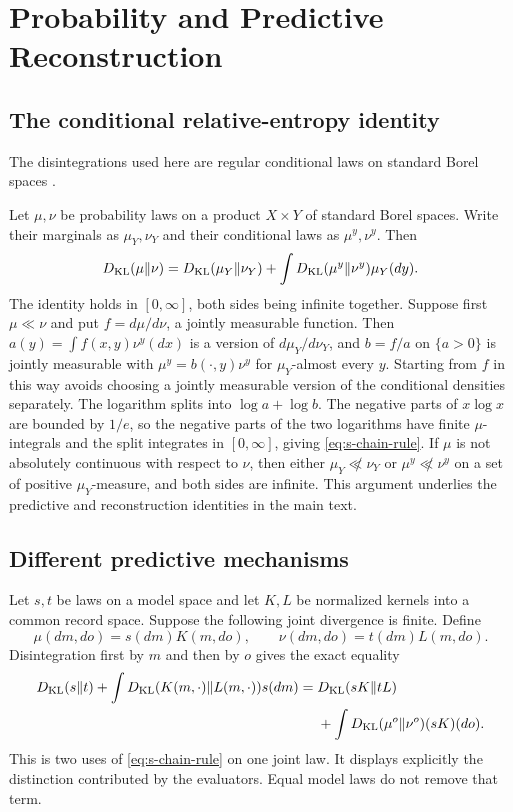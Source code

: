 \chapter{Probability and Predictive Reconstruction}
\label{s:probability}

\section{The conditional relative-entropy identity}

The disintegrations used here are regular conditional laws on standard Borel spaces \citep{Kallenberg2021}.

Let $\mu,\nu$ be probability laws on a product $X\times Y$ of standard Borel spaces. Write their marginals as $\mu_Y,\nu_Y$ and their conditional laws as $\mu^y,\nu^y$. Then
\begin{equation}
D_{\mathrm{KL}}(\mu\Vert\nu)
=D_{\mathrm{KL}}(\mu_Y\Vert\nu_Y)
+\int D_{\mathrm{KL}}(\mu^y\Vert\nu^y)\mu_Y(dy).
\label{eq:s-chain-rule}
\end{equation}
The identity holds in $[0,\infty]$, both sides being infinite together. Suppose first $\mu\ll\nu$ and put $f=d\mu/d\nu$, a jointly measurable function. Then $a(y)=\int f(x,y)\nu^y(dx)$ is a version of $d\mu_Y/d\nu_Y$, and $b=f/a$ on $\{a>0\}$ is jointly measurable with $\mu^y=b(\cdot,y)\nu^y$ for $\mu_Y$-almost every $y$. Starting from $f$ in this way avoids choosing a jointly measurable version of the conditional densities separately. The logarithm splits into $\log a+\log b$. The negative parts of $x\log x$ are bounded by $1/e$, so the negative parts of the two logarithms have finite $\mu$-integrals and the split integrates in $[0,\infty]$, giving \cref{eq:s-chain-rule}. If $\mu$ is not absolutely continuous with respect to $\nu$, then either $\mu_Y\not\ll\nu_Y$ or $\mu^y\not\ll\nu^y$ on a set of positive $\mu_Y$-measure, and both sides are infinite. This argument underlies the predictive and reconstruction identities in the main text.

\section{Different predictive mechanisms}

Let $s,t$ be laws on a model space and let $K,L$ be normalized kernels into a common record space. Suppose the following joint divergence is finite. Define
\begin{equation}
\mu(dm,do)=s(dm)K(m,do),
\qquad \nu(dm,do)=t(dm)L(m,do).
\end{equation}
Disintegration first by $m$ and then by $o$ gives the exact equality
\begin{equation}
\begin{aligned}
D_{\mathrm{KL}}(s\Vert t)+\int D_{\mathrm{KL}}(K(m,\cdot)\Vert L(m,\cdot))s(dm)
={}&D_{\mathrm{KL}}(sK\Vert tL)\\
&+\int D_{\mathrm{KL}}(\mu^o\Vert\nu^o)(sK)(do).
\end{aligned}
\label{eq:s-different-evaluators}
\end{equation}
This is two uses of \cref{eq:s-chain-rule} on one joint law. It displays explicitly the distinction contributed by the evaluators. Equal model laws do not remove that term.

